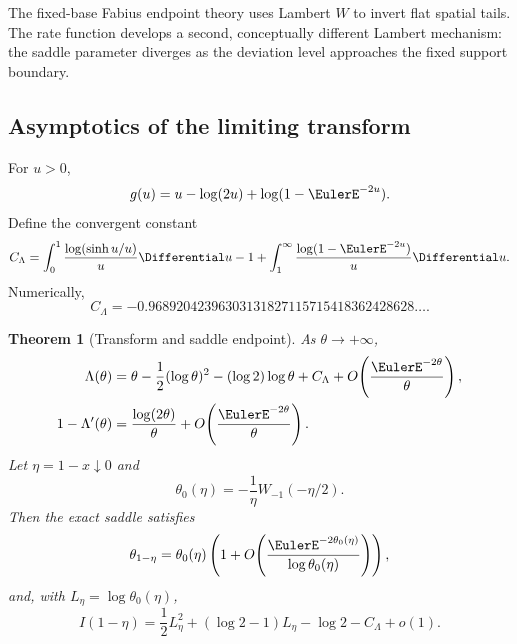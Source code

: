 \documentclass[11pt,a4paper]{article}
\newtheorem{theorem}{Theorem}[section]
\theoremstyle{definition}
\newcommand{\cL}{C_{\Lambda}}
\begin{document}
The fixed-base Fabius endpoint theory uses Lambert $W$ to invert flat spatial
tails.  The rate function develops a second, conceptually different Lambert
mechanism: the saddle parameter diverges as the deviation level approaches
the fixed support boundary.

\subsection{Asymptotics of the limiting transform}

For $u>0$,
\begin{equation}
 g(u)=u-\log(2u)+\log(1-\EulerE^{-2u}).
 \label{eq:g-large}
\end{equation}
Define the convergent constant
\begin{equation}
 \cL=
 \int_0^1\frac{\log(\sinh u/u)}{u}\Differential u-1
 +\int_1^\infty\frac{\log(1-\EulerE^{-2u})}{u}\Differential u.
 \label{eq:CLambda}
\end{equation}
Numerically,
\begin{equation}
 \cL=-0.96892042396303131827115715418362428628\ldots.
 \label{eq:CLambda-value}
\end{equation}

\begin{theorem}[Transform and saddle endpoint]
\label{thm:Lambert-edge}
As $\theta\to+\infty$,
\begin{align}
 \Lambda(\theta)
 &=\theta-\frac12(\log\theta)^2
   -(\log2)\log\theta+\cL
   +O\!\left(\frac{\EulerE^{-2\theta}}{\theta}\right),
 \label{eq:Lambda-large}\\
 1-\Lambda'(\theta)
 &=\frac{\log(2\theta)}{\theta}
   +O\!\left(\frac{\EulerE^{-2\theta}}{\theta}\right).
 \label{eq:Lambda-prime-large}
\end{align}
Let $\eta=1-x\downarrow0$ and
\begin{equation}
 \theta_0(\eta)=-\frac1\eta W_{-1}(-\eta/2).
 \label{eq:theta-Lambert}
\end{equation}
Then the exact saddle satisfies
\begin{equation}
 \theta_{1-\eta}=\theta_0(\eta)
 \left(1+O\!\left(\frac{\EulerE^{-2\theta_0(\eta)}}{\log\theta_0(\eta)}\right)\right),
 \label{eq:theta-Lambert-error}
\end{equation}
and, with $L_\eta=\log\theta_0(\eta)$,
\begin{equation}
 I(1-\eta)
 =\frac12L_\eta^2+(\log2-1)L_\eta
   -\log2-\cL+o(1).
 \label{eq:I-Lambert}
\end{equation}
\end{theorem}
\end{document}
